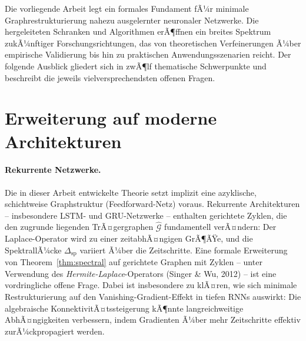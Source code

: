 ﻿\documentclass[12pt, a4paper, openany]{report}
\newcommand{\calG}{\mathcal{G}}
\begin{document}
Die vorliegende Arbeit legt ein formales Fundament fÃ¼r minimale
Graphrestrukturierung nahezu ausgelernter neuronaler Netzwerke.  Die
hergeleiteten Schranken und Algorithmen erÃ¶ffnen ein breites Spektrum
zukÃ¼nftiger Forschungsrichtungen, das von theoretischen Verfeinerungen
Ã¼ber empirische Validierung bis hin zu praktischen Anwendungsszenarien
reicht.  Der folgende Ausblick gliedert sich in zwÃ¶lf thematische
Schwerpunkte und beschreibt die jeweils vielversprechendsten offenen
Fragen.

\section{Erweiterung auf moderne Architekturen}
\label{sec:outlook_arch}

\paragraph{Rekurrente Netzwerke.}
Die in dieser Arbeit entwickelte Theorie setzt implizit eine azyklische,
schichtweise Graphstruktur (Feedforward-Netz) voraus.  Rekurrente
Architekturen -- insbesondere LSTM- und GRU-Netzwerke -- enthalten
gerichtete Zyklen, die den zugrunde liegenden TrÃ¤gergraphen $\hat{\calG}$
fundamentell verÃ¤ndern: Der Laplace-Operator wird zu einer zeitabhÃ¤ngigen
GrÃ¶ÃŸe, und die SpektrallÃ¼cke $\Delta_{\mathrm{sp}}$ variiert Ã¼ber die
Zeitschritte.  Eine formale Erweiterung von Theorem~\ref{thm:spectral}
auf gerichtete Graphen mit Zyklen -- unter Verwendung des
\emph{Hermite-Laplace}-Operators (Singer \& Wu, 2012) -- ist eine
vordringliche offene Frage.  Dabei ist insbesondere zu klÃ¤ren, wie sich
minimale Restrukturierung auf den Vanishing-Gradient-Effekt in tiefen
RNNs auswirkt: Die algebraische KonnektivitÃ¤tssteigerung kÃ¶nnte
langreichweitige AbhÃ¤ngigkeiten verbessern, indem Gradienten Ã¼ber mehr
Zeitschritte effektiv zurÃ¼ckpropagiert werden.
\end{document}
